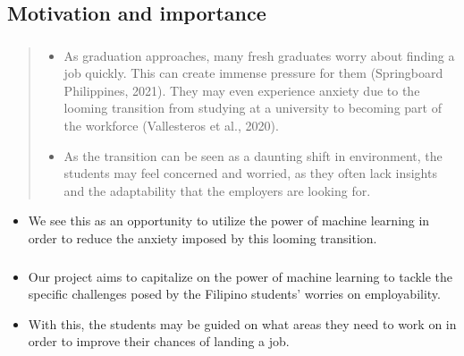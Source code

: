 \subsection{Motivation and importance}
\begin{frame}
\frametitle{\subsecname}
	\begin{quote}
		\begin{itemize}
			\item As graduation approaches, many fresh graduates worry about finding a job quickly. This can create immense pressure for them (Springboard Philippines, 2021). They may even experience anxiety due to the looming transition from studying at a university to becoming part of the workforce (Vallesteros et al., 2020).
			\item As the transition can be seen as a daunting shift in environment, the students may feel concerned and worried, as they often lack insights and the adaptability that the employers are looking for.
		\end{itemize}
	\end{quote}
	\begin{itemize}
		\item We see this as an opportunity to utilize the power of machine learning in order to reduce the anxiety imposed by this looming transition.
	\end{itemize}
\end{frame}

\begin{frame}
\frametitle{\subsecname}
	\begin{itemize}
		\item Our project aims to capitalize on the power of machine learning to tackle the specific challenges posed by the Filipino students’ worries on employability.
		\item With this, the students may be guided on what areas they need to work on in order to improve their chances of landing a job.
	\end{itemize}
\end{frame}
